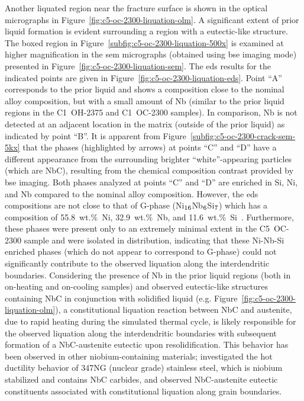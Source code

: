 {Another liquated region near the fracture surface is shown in the optical micrographs in Figure~\ref{fig:c5-oc-2300-liquation-olm}. A significant extent of prior liquid formation is evident surrounding a region with a eutectic-like structure. The boxed region in Figure~\ref{subfig:c5-oc-2300-liquation-500x} is examined at higher magnification in the \gls{sem} micrographs (obtained using \gls{bse} imaging mode) presented in Figure~\ref{fig:c5-oc-2300-liquation-sem}. The \gls{eds} results for the indicated points are given in Figure~\ref{fig:c5-oc-2300-liquation-eds}. Point ``A'' corresponds to the prior liquid and shows a composition close to the nominal alloy composition, but with a small amount of Nb (similar to the prior liquid regions in the C1~OH-2375 and C1~OC-2300 samples). In comparison, Nb is not detected at an adjacent location in the matrix (outside of the prior liquid) as indicated by point ``B''. It is apparent from Figure~\ref{subfig:c5-oc-2300-crack-sem-5kx} that the phases (highlighted by arrows) at points ``C'' and ``D'' have a different appearance from the surrounding brighter ``white''-appearing particles (which are NbC), resulting from the chemical composition contrast provided by \gls{bse} imaging. Both phases analyzed at points ``C'' and ``D'' are enriched in Si, Ni, and Nb compared to the nominal alloy composition. However, the \gls{eds} compositions are not close to that of G-phase (Ni$_\textnormal{16}$Nb$_\textnormal{6}$Si$_\textnormal{7}$) which has a composition of 55.8~wt.\%~Ni, 32.9~wt.\%~Nb, and 11.6~wt.\%~Si~\cite{hoffman_high_2000-1}. Furthermore, these phases were present only to an extremely minimal extent in the C5~OC-2300 sample and were isolated in distribution, indicating that these Ni-Nb-Si enriched phases (which do not appear to correspond to G-phase) could not significantly contribute to the observed liquation along the interdendritic boundaries. Considering the presence of Nb in the prior liquid regions (both in on-heating and on-cooling samples) and observed eutectic-like structures containing NbC in conjunction with solidified liquid (e.g. Figure~\ref{fig:c5-oc-2300-liquation-olm}), a constitutional liquation reaction between NbC and austenite, due to rapid heating during the simulated thermal cycle, is likely responsible for the observed liquation along the interdendritic boundaries with subsequent formation of a NbC-austenite eutectic upon resolidification. This behavior has been observed in other niobium-containing materials; \citet{lee_weldability_1988} investigated the hot ductility behavior of 347NG (nuclear grade) stainless steel, which is niobium stabilized and contains NbC carbides, and observed NbC-austenite eutectic constituents associated with constitutional liquation along grain boundaries.

}
